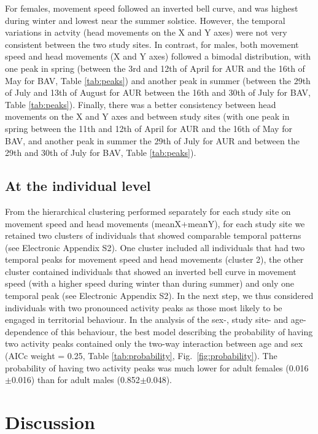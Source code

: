 \documentclass[a4paper,11pt]{article}
\begin{document}
For females, movement speed followed an inverted bell curve, and was
highest during winter and lowest near the summer solstice. However,
the temporal variations in actvity (head movements on the X and Y
axes) were not very consistent between the two study sites. In
contrast, for males, both movement speed and head movements (X and Y
axes) followed a bimodal distribution, with one peak in spring
(between the 3rd and 12th of April for AUR and the 16th of May for
BAV, Table \ref{tab:peaks}) and another peak in summer (between the
29th of July and 13th of August for AUR between the 16th and 30th of
July for BAV, Table \ref{tab:peaks}). Finally, there was a better
consistency between head movements on the X and Y axes and between
study sites (with one peak in spring between the 11th and 12th of
April for AUR and the 16th of May for BAV, and another peak in summer
the 29th of July for AUR and between the 29th and 30th of July for
BAV, Table \ref{tab:peaks}).

\subsection*{At the individual level}
From the hierarchical clustering performed separately for each study
site on movement speed and head movements (meanX+meanY), for each
study site we retained two clusters of individuals that showed
comparable temporal patterns (see Electronic Appendix S2). One cluster
included all individuals that had two temporal peaks for movement
speed and head movements (cluster 2), the other cluster contained
individuals that showed an inverted bell curve in movement speed (with
a higher speed during winter than during summer) and only one temporal
peak (see Electronic Appendix S2). In the next step, we thus
considered individuals with two pronounced activity peaks as those
most likely to be engaged in territorial behaviour. In the analysis of
the sex-, study site- and age- dependence of this behaviour, the best
model describing the probability of having two activity peaks
contained only the two-way interaction between age and sex (AICc
weight = 0.25, Table \ref{tab:probability},
Fig.~\ref{fig:probability}). The probability of having two activity
peaks was much lower for adult females (0.016$\pm$0.016) than for
adult males (0.852$\pm$0.048).

\section*{Discussion}
\end{document}
